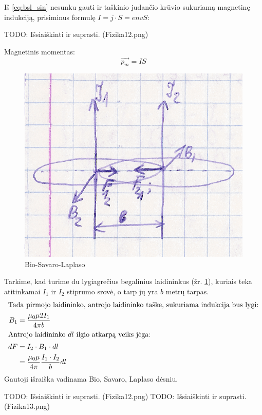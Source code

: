 Iš \ref{eq:bsl_sin} nesunku gauti ir taškinio judančio krūvio
sukuriamą magnetinę indukciją, prisiminus formulę
$I = j \cdot S = e n v S$:

TODO: Išsiaiškinti ir suprasti. (Fizika12.png)

Magnetinis momentas:
\begin{equation*}
  \vec{p_{m}} = IS
\end{equation*}

\begin{figure}[H]
  \begin{center}
    \includegraphics[height=0.5\textwidth]{images/bio_savaro_laplaso.png}
  \end{center}
  \caption{Bio-Savaro-Laplaso}
  \label{fig:bio_savaro_laplaso}
\end{figure}

\begin{defn}
  Tarkime, kad turime du lygiagrečius begalinius laidininkus (žr.
  \ref{fig:bio_savaro_laplaso}), kuriais teka atitinkamai $I_{1}$
  ir $I_{2}$ stiprumo srovė, o tarp jų yra $b$ metrų tarpas.
  \begin{align*}
    \intertext{Tada pirmojo laidininko, antrojo laidininko taške,
    sukuriama indukcija bus lygi:}
    B_{1} &= \frac{\mu_{0}\mu 2 I_{1}}{4 \pi b} \\
    \intertext{Antrojo laidininko $dl$ ilgio atkarpą veiks jėga:}
    dF
    &= I_{2} \cdot B_{1} \cdot dl \\
    &= \frac{\mu_{0}\mu}{4 \pi} \frac{I_{1}\cdot I_{2}}{b} dl \\
  \end{align*}
  Gautoji išraiška vadinama Bio, Savaro, Laplaso dėsniu.
\end{defn}

TODO: Išsiaiškinti ir suprasti. (Fizika12.png)
TODO: Išsiaiškinti ir suprasti. (Fizika13.png)
